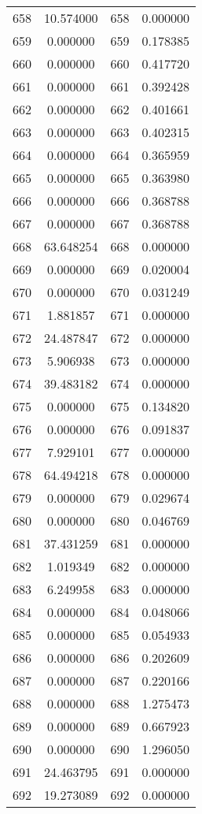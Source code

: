 \documentclass[12pt]{article}
\begin{document}
\begin{longtable}{@{}cccc@{}}
658 & 10.574000 & 658 & 0.000000 \\
659 & 0.000000 & 659 & 0.178385 \\
660 & 0.000000 & 660 & 0.417720 \\
661 & 0.000000 & 661 & 0.392428 \\
662 & 0.000000 & 662 & 0.401661 \\
663 & 0.000000 & 663 & 0.402315 \\
664 & 0.000000 & 664 & 0.365959 \\
665 & 0.000000 & 665 & 0.363980 \\
666 & 0.000000 & 666 & 0.368788 \\
667 & 0.000000 & 667 & 0.368788 \\
668 & 63.648254 & 668 & 0.000000 \\
669 & 0.000000 & 669 & 0.020004 \\
670 & 0.000000 & 670 & 0.031249 \\
671 & 1.881857 & 671 & 0.000000 \\
672 & 24.487847 & 672 & 0.000000 \\
673 & 5.906938 & 673 & 0.000000 \\
674 & 39.483182 & 674 & 0.000000 \\
675 & 0.000000 & 675 & 0.134820 \\
676 & 0.000000 & 676 & 0.091837 \\
677 & 7.929101 & 677 & 0.000000 \\
678 & 64.494218 & 678 & 0.000000 \\
679 & 0.000000 & 679 & 0.029674 \\
680 & 0.000000 & 680 & 0.046769 \\
681 & 37.431259 & 681 & 0.000000 \\
682 & 1.019349 & 682 & 0.000000 \\
683 & 6.249958 & 683 & 0.000000 \\
684 & 0.000000 & 684 & 0.048066 \\
685 & 0.000000 & 685 & 0.054933 \\
686 & 0.000000 & 686 & 0.202609 \\
687 & 0.000000 & 687 & 0.220166 \\
688 & 0.000000 & 688 & 1.275473 \\
689 & 0.000000 & 689 & 0.667923 \\
690 & 0.000000 & 690 & 1.296050 \\
691 & 24.463795 & 691 & 0.000000 \\
692 & 19.273089 & 692 & 0.000000 \\

\end{longtable}
\end{document}
